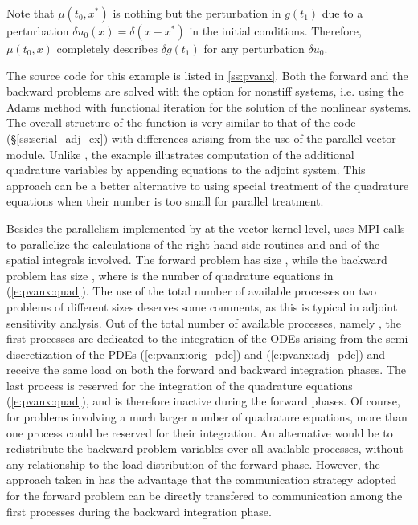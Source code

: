 Note that $\mu(t_0 , x^*)$ is nothing but the perturbation in $g(t_1)$
due to a perturbation $\delta u_0(x) = \delta(x-x^*)$ in the initial conditions.
Therefore, $\mu(t_0,x)$ completely describes $\delta g(t_1)$ for any
perturbation $\delta u_0$.

The source code for this example is listed in \A\ref{ss:pvanx}. Both the forward
and the backward problems are solved with the option for nonstiff systems,
i.e. using the Adams method with functional iteration for the solution of
the nonlinear systems. The overall structure of the  function is very
similar to that of the code  (\S\ref{ss:serial_adj_ex}) with 
differences arising from the use of the parallel vector module. Unlike 
, the example  illustrates computation of the additional
quadrature variables by appending  equations to the adjoint system.
This approach can be a better alternative to using special treatment
of the quadrature equations when their number is too small for parallel 
treatment.

Besides the parallelism implemented by {\cvodes} at the vector kernel level,
 uses MPI calls to parallelize the calculations of the right-hand side
routines  and  and of the spatial integrals involved.
The forward problem has size , while the backward problem has
size , where  is the number of quadrature equations
in (\ref{e:pvanx:quad}).
The use of the total number of available processes on two problems of different 
sizes deserves some comments, as this is typical in adjoint sensitivity 
analysis. Out of the total number of available processes, namely ,
the first  processes are dedicated to the integration of
the ODEs arising from the semi-discretization of the PDEs 
(\ref{e:pvanx:orig_pde}) and (\ref{e:pvanx:adj_pde}) and receive
the same load on both the forward and backward integration phases. 
The last process is reserved for the integration of the quadrature equations 
(\ref{e:pvanx:quad}), and is therefore inactive during the forward phases.
Of course, for problems involving a much larger number of quadrature equations,
more than one process could be reserved for their integration. 
An alternative would be to redistribute the  backward problem variables 
over all available processes, without any relationship to the load distribution 
of the forward phase. However, the approach taken in  has the 
advantage that the communication strategy adopted for the forward problem 
can be directly transfered to communication among the first 
processes during the backward integration phase. 

